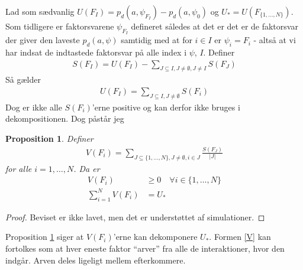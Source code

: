 \documentclass[a4paper, 12pt]{article}
\newtheorem{proposition}{Proposition}
\begin{document}
Lad som sædvanlig $U(F_I)=p_d(a,\psi_{F_I})-p_d(a, \psi_{0})$ og $U_*=U(F_{\{1,\dots,N\}})$. Som tidligere er faktorsvarene $\psi_{F_I}$ defineret således at det er det er de faktorsvar der giver den laveste $p_d(a,\psi)$ samtidig med at for $i\in I$ er $\psi_i=F_{i}$ - altså at vi har indsat de indtastede faktorsvar på alle index i $\psi$, $I$. Definer
\begin{align*}
S(F_I)=U(F_I)-\sum_{J\subseteq I, J\neq \emptyset, J\neq I} S(F_J)
\end{align*}
Så gælder
\begin{align*}
U(F_I)=\sum_{J\subseteq I, J\neq \emptyset}S(F_i)
\end{align*}
Dog er ikke alle $S(F_i)$'erne positive og kan derfor ikke bruges i dekompositionen. Dog påstår jeg

\begin{proposition}\label{divided}
Definer
\begin{align}
V(F_i)=\sum_{J\subseteq\{1,\dots, N\}, J\neq \emptyset, i\in J} \frac{S(F_J)}{|J|}\label{V}
\end{align}
for alle $i=1, \dots, N$. Da er
\begin{align}
V(F_i)&\geq 0 \quad \forall i\in \{1, \dots, N\}\\
\sum_{i=1}^NV(F_i)&=U_*
\end{align}
\end{proposition}
\begin{proof}
Beviset er ikke lavet, men det er understøttet af simulationer. 
\end{proof}

Proposition \ref{divided} siger at $V(F_i)$'erne kan dekomponere $U_*$. Formen \eqref{V} kan fortolkes som at hver eneste faktor ``arver'' fra alle de interaktioner, hvor den indgår. Arven deles ligeligt mellem efterkommere.
\end{document}
